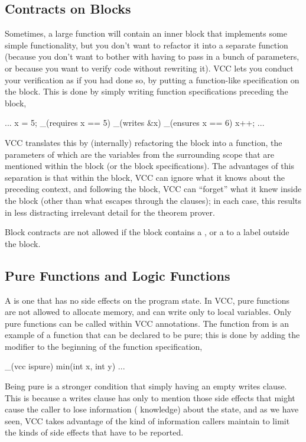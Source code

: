 \subsection{Contracts on Blocks} 

Sometimes, a large function will contain an inner block that
implements some simple functionality, but you don't want to refactor
it into a separate function (\eg because you don't want to bother with
having to pass in a bunch of parameters, or because you want to verify
code without rewriting it). VCC lets you conduct your verification as
if you had done so, by putting a function-like specification on the
block.
This is done by simply writing function specifications
preceding the block, \eg
\begin{VCC}
...
x = 5;
_(requires x == 5)
_(writes &x)
_(ensures x == 6)
{
  x++;
}
...
\end{VCC}
VCC translates this by (internally) refactoring the block into a
function, the parameters of which are the variables from the
surrounding scope that are mentioned within the block (or the block
specifications). The advantages of this separation is that within the block,
VCC can ignore what it knows about the preceding context, and
following the block, VCC can ``forget'' what it knew inside the block
(other than what escapes through the  clauses); in each
case, this results in less distracting irrelevant detail for the
theorem prover.

Block contracts are not allowed if the block contains a ,
or a  to a label outside the block.

\subsection{Pure Functions and Logic Functions}
\label{sect:pureFunctions}
A  is one that has no side effects on the program
state. In VCC, pure functions are not allowed to allocate memory, and can
write only to local variables. Only pure functions can be called within VCC
annotations. The function  from  is an
example of a function that can be declared to be pure; this is done by
adding the modifier  to the beginning of the function specification,
\eg
\begin{VCC}
_(vcc ispure) min(int x, int y) ...
\end{VCC}

Being pure is a stronger condition that simply having an empty writes
clause. This is because a writes clause has only to mention those side
effects that might cause the caller to lose information (\ie
knowledge) about the state, and as we have seen, VCC takes advantage
of the kind of information callers maintain to limit the kinds of side
effects that have to be reported.

